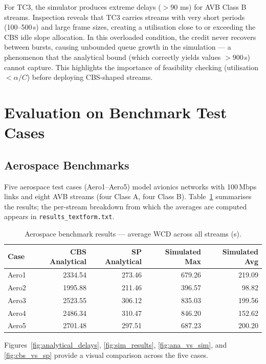 For TC3, the simulator produces extreme delays ($>90$ ms) for AVB Class B streams. Inspection reveals that TC3 carries streams with very short periods (100--500\,\textmu s) and large frame sizes, creating a utilisation close to or exceeding the CBS idle slope allocation. In this overloaded condition, the credit never recovers between bursts, causing unbounded queue growth in the simulation — a phenomenon that the analytical bound (which correctly yields values $>900$\,\textmu s) cannot capture. This highlights the importance of feasibility checking (utilisation $< \alpha / C$) before deploying CBS-shaped streams.

\section{Evaluation on Benchmark Test Cases}
\label{sec:eval}

\subsection{Aerospace Benchmarks}

Five aerospace test cases (Aero1--Aero5) model avionics networks with 100\,Mbps links and eight AVB streams (four Class A, four Class B). Table~\ref{tab:aero} summarises the results; the per-stream breakdown from which the averages are computed appears in \texttt{results\_textform.txt}.

\begin{table}[H]
\centering
\caption{Aerospace benchmark results — average WCD across all streams (\textmu s).}
\label{tab:aero}
\begin{tabular}{lrrrr}
\toprule
Case & CBS Analytical & SP Analytical & Simulated Max & Simulated Avg \\
\midrule
Aero1 & 2334.54 & 273.46 & 679.26  & 219.09 \\
Aero2 & 1995.88 & 211.46 & 396.57  & 98.82  \\
Aero3 & 2523.55 & 306.12 & 835.03  & 199.56 \\
Aero4 & 2486.34 & 310.47 & 846.20  & 152.62 \\
Aero5 & 2701.48 & 297.51 & 687.23  & 200.20 \\
\bottomrule
\end{tabular}
\end{table}

Figures~\ref{fig:analytical_delays}, \ref{fig:sim_results}, \ref{fig:ana_vs_sim}, and \ref{fig:cbs_vs_sp} provide a visual comparison across the five cases.

